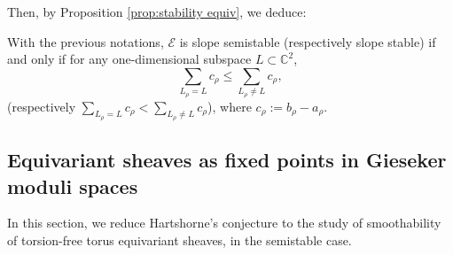 \documentclass[a4paper,10pt]{amsart}
\theoremstyle{plain}{
    \newtheorem{theorem}{Theorem}[section]
    \newtheorem{lemma}[theorem]{Lemma}
    \newtheorem{corollary}[theorem]{Corollary}
    \newtheorem{proposition}[theorem]{Proposition}
    \newtheorem{conjecture}[theorem]{Conjecture}
}
\theoremstyle{definition}{
    \newtheorem{definition}[theorem]{Definition}
    \newtheorem{defn-thm}[theorem]{Definition-Theorem}
    \newtheorem{example}[theorem]{Example}
    \newtheorem{notation}[theorem]{Notation}
}
\theoremstyle{remark}{
    \newtheorem{remark}[theorem]{Remark}
    \newtheorem{problem}[theorem]{Problem}
    \newtheorem{question}[theorem]{Question}
}
\def\cE{\mathcal{E}}
\def\C{\mathbb{C}}
\begin{document}
 Then, by Proposition \ref{prop:stability equiv}, we deduce:
 \begin{corollary}
  \label{cor:slope stable rank two}
  With the previous notations, $\cE$ is slope semistable (respectively slope stable) if and only if for any one-dimensional subspace $L\subset \C^2$, 
  $$
  \sum_{L_\rho = L} c_\rho \leq \sum_{L_\rho \neq L} c_\rho,
  $$
  (respectively $\sum_{L_\rho = L} c_\rho < \sum_{L_\rho \neq L} c_\rho$), where $c_\rho:=b_\rho-a_\rho$.
 \end{corollary}


\subsection{Equivariant sheaves as fixed points in Gieseker moduli spaces}
\label{sec:new approach}
In this section, we reduce Hartshorne's conjecture to the study of smoothability of torsion-free torus equivariant sheaves, in the semistable case.
\end{document}
